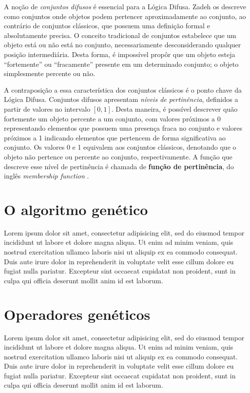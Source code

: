 \documentclass[12pt]{article}
\begin{document}
A noção de \textit{conjuntos difusos} é essencial para a Lógica Difusa. Zadeh os descreve como conjuntos onde objetos podem pertencer aproximadamente ao conjunto, ao contrário de conjuntos clássicos, que possuem uma definição formal e absolutamente precisa. O conceito tradicional de conjuntos estabelece que um objeto está ou não está no conjunto, necessariamente desconsiderando qualquer posição intermediária. Desta forma, é impossível propôr que um objeto esteja ``fortemente'' ou ``fracamente'' presente em um determinado conjunto; o objeto simplesmente percente ou não.

A contraposição a essa característica dos conjuntos clássicos é o ponto chave da Lógica Difusa. Conjuntos difusos apresentam \textit{níveis de pertinência}, definidos a partir de valores no intervalo $[0, 1]$. Desta maneira, é possível descrever quão fortemente um objeto percente a um conjunto, com valores próximos a 0 representando elementos que possuem uma presença fraca no conjunto e valores próximos a 1 indicando elementos que pertencem de forma significativa ao conjunto. Os valores 0 e 1 equivalem aos conjuntos clássicos, denotando que o objeto não pertence ou percente ao conjunto, respectivamente. A função que descreve esse nível de pertinência é chamada de \textbf{função de pertinência}, do inglês \textit{membership function} \cite{Zadeh1965}.

\section{O algoritmo genético} \label{sec:algorithm}

Lorem ipsum dolor sit amet, consectetur adipisicing elit, sed do eiusmod tempor incididunt ut labore et dolore magna aliqua. Ut enim ad minim veniam, quis nostrud exercitation ullamco laboris nisi ut aliquip ex ea commodo consequat. Duis aute irure dolor in reprehenderit in voluptate velit esse cillum dolore eu fugiat nulla pariatur. Excepteur sint occaecat cupidatat non proident, sunt in culpa qui officia deserunt mollit anim id est laborum.

\section{Operadores genéticos} \label{sec:operators}

Lorem ipsum dolor sit amet, consectetur adipisicing elit, sed do eiusmod tempor incididunt ut labore et dolore magna aliqua. Ut enim ad minim veniam, quis nostrud exercitation ullamco laboris nisi ut aliquip ex ea commodo consequat. Duis aute irure dolor in reprehenderit in voluptate velit esse cillum dolore eu fugiat nulla pariatur. Excepteur sint occaecat cupidatat non proident, sunt in culpa qui officia deserunt mollit anim id est laborum.
\end{document}
